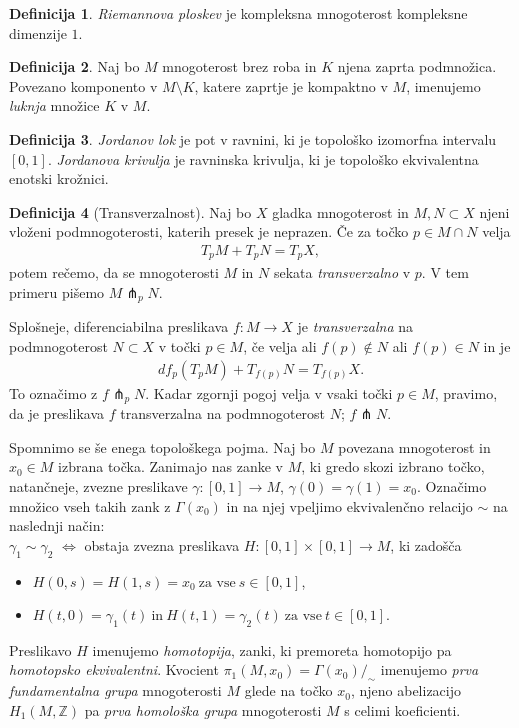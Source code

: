 \documentclass[12pt,a4paper,twoside]{article}
\theoremstyle{definition} %
\newtheorem{definicija}{Definicija}[section]
\theoremstyle{plain} %
\numberwithin{equation}{section}  %
\begin{document}
\begin{definicija}
\emph{Riemannova ploskev} je kompleksna mnogoterost kompleksne dimenzije $1$.
\end{definicija}

\begin{definicija}
Naj bo $M$ mnogoterost brez roba in $K$ njena zaprta podmnožica. Povezano komponento v $M \setminus K$, katere zaprtje je kompaktno v $M$, imenujemo \emph{luknja} množice $K$ v $M$.
\end{definicija}

\begin{definicija}
\emph{Jordanov lok} je pot v ravnini, ki je topološko izomorfna intervalu $[0,1]$.
\emph{Jordanova krivulja} je ravninska krivulja, ki je topološko ekvivalentna enotski krožnici.
\end{definicija}

\begin{definicija} [Transverzalnost]
Naj bo $X$ gladka mnogoterost in $M, N \subset X$ njeni vloženi podmnogoterosti, katerih presek je neprazen.
Če za točko $p \in M \cap N$ velja
\begin{gather*}
T_{p}M + T_{p}N = T_{p}X,
\end{gather*} 
potem rečemo, da se mnogoterosti $M$ in $N$ sekata \emph{transverzalno} v $p$. V tem primeru pišemo $M \pitchfork_{p} N$.

Splošneje, diferenciabilna preslikava $f \colon M \to X$ je \emph{transverzalna} na podmnogoterost $N \subset X$ v točki $p \in M$, če velja ali $f(p) \notin N$ ali $f(p) \in N$ in je
\begin{gather*}
df_{p}(T_{p}M) + T_{f(p)}N = T_{f(p)}X.
\end{gather*}
To označimo z $f \pitchfork_{p} N$. Kadar zgornji pogoj velja v vsaki točki $p \in M$, pravimo, da je preslikava $f$ transverzalna na podmnogoterost $N$; $f \pitchfork N$.
\end{definicija}

Spomnimo se še enega topološkega pojma. Naj bo $M$ povezana mnogoterost in $x_{0} \in M$ izbrana točka. Zanimajo nas zanke v $M$, ki gredo skozi izbrano točko, natančneje, zvezne preslikave $\gamma \colon [0,1] \to M$, $\gamma(0) = \gamma(1) = x_{0}$. Označimo množico vseh takih zank z $\Gamma(x_{0})$ in na njej vpeljimo ekvivalenčno relacijo $\sim$ na naslednji način:\\[0.3cm]
$\gamma_{1} \sim \gamma_{2}$ $\iff$ obstaja zvezna preslikava $H \colon [0,1] \times [0,1] \to M$, ki zadošča 
\begin{itemize}
\item $H(0,s) = H(1,s) = x_{0} \ \text{za vse} \ s \in [0,1]$, 
\item $H(t,0) = \gamma_{1}(t) \ \text{in} \ H(t,1) = \gamma_{2}(t) \ \text{za vse} \ t \in [0,1]$.
\end{itemize}
Preslikavo $H$ imenujemo \emph{homotopija}, zanki, ki premoreta homotopijo pa \emph{homotopsko ekvivalentni}.
Kvocient $\pi_{1}(M,x_{0}) = \Gamma(x_{0}) / _{\sim}$ imenujemo \emph{prva fundamentalna grupa} mnogoterosti $M$ glede na točko $x_{0}$, njeno abelizacijo $H_{1}(M, \mathbb{Z})$ pa \emph{prva homološka grupa} mnogoterosti $M$ s celimi koeficienti.
\end{document}
